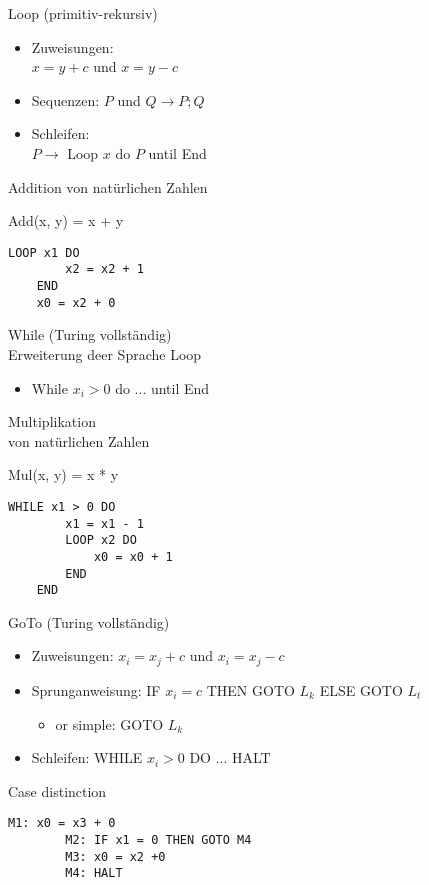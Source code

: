 \begin{minipage}{0.5\linewidth}
    \begin{KR}{Loop (primitiv-rekursiv)}
        \begin{itemize}
            \item Zuweisungen:\\ $x = y + c$ und $x = y - c$
            \item Sequenzen: $P$ und $Q \rightarrow P; Q$
            \item Schleifen:\\ $P \rightarrow$ Loop $x$ do $P$ until End
        \end{itemize}
    \end{KR}
    
    \begin{example2}{Addition von natürlichen Zahlen}
    
        Add(x, y) = x + y
    \begin{lstlisting}[style=Pseudocode]
    LOOP x1 DO
        x2 = x2 + 1
    END
    x0 = x2 + 0
    \end{lstlisting}
    \end{example2}
\end{minipage}
\begin{minipage}{0.5\linewidth}
    \begin{KR}{While (Turing vollständig)}\\
        Erweiterung deer Sprache Loop
        \begin{itemize}
            \item While $x_i > 0$ do ... until End
        \end{itemize}
    \end{KR}
    
    \begin{example2}{Multiplikation \\von natürlichen Zahlen}
        
        Mul(x, y) = x * y
    \begin{lstlisting}[style=Pseudocode]
    WHILE x1 > 0 DO
        x1 = x1 - 1
        LOOP x2 DO
            x0 = x0 + 1
        END
    END
    \end{lstlisting}
    \end{example2}
\end{minipage}




\begin{KR}{GoTo (Turing vollständig)}
    \begin{itemize}
        \item Zuweisungen: $x_i = x_j + c$ und $x_i = x_j - c$
        \item Sprunganweisung: IF $x_i = c$ THEN GOTO $L_k$ ELSE GOTO $L_t$
        \begin{itemize}
            \item or simple: GOTO $L_k$
        \end{itemize}
        \item Schleifen: WHILE $x_i > 0$ DO ... HALT
    \end{itemize}
\end{KR}

\begin{example2}{Case distinction}
    \begin{lstlisting}[style=Pseudocode]
        M1: x0 = x3 + 0
        M2: IF x1 = 0 THEN GOTO M4
        M3: x0 = x2 +0
        M4: HALT
    \end{lstlisting}
\end{example2}